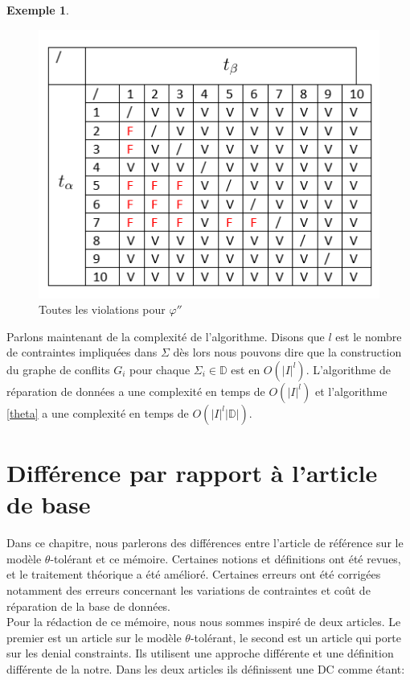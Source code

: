 \documentclass[letterpaper, 12pt]{report}
\theoremstyle{definition}
\newtheorem{myexample}{Exemple}
\begin{document}
\begin{myexample}
\begin{figure}[H]
\centering
\includegraphics[scale=0.95]{img/TaxEqual}
\caption{\label{EqualTax} Toutes les violations pour $\varphi''$}
\end{figure}

\end{myexample}

Parlons maintenant de la complexité de l'algorithme. Disons que $l$ est le nombre de contraintes impliquées dans $\Sigma$ dès lors nous pouvons dire que la construction du graphe de conflits $G_i$ pour chaque $\Sigma_i \in \mathbb{D}$ est en $O(|I|^l)$. L'algorithme de réparation de données a une complexité en temps de $O(|I|^l)$ et l'algorithme \ref{theta} a une complexité en temps de $O(|I|^l|\mathbb{D}|)$. 

\chapter{Différence par rapport à l'article de base}

Dans ce chapitre, nous parlerons des différences entre l'article de référence sur le modèle $\theta$-tolérant et ce mémoire. Certaines notions et définitions ont été revues, et le traitement théorique a été amélioré. Certaines erreurs ont été corrigées notamment des erreurs concernant les variations de contraintes et coût de réparation de la base de données.\\

Pour la rédaction de ce mémoire, nous nous sommes inspiré de deux articles. Le premier est un article sur le modèle $\theta$-tolérant, le second est un article qui porte sur les denial constraints. Ils utilisent une approche différente et une définition différente de la notre. Dans les deux articles \cite{main,DCs} ils définissent une DC comme étant:
\end{document}
